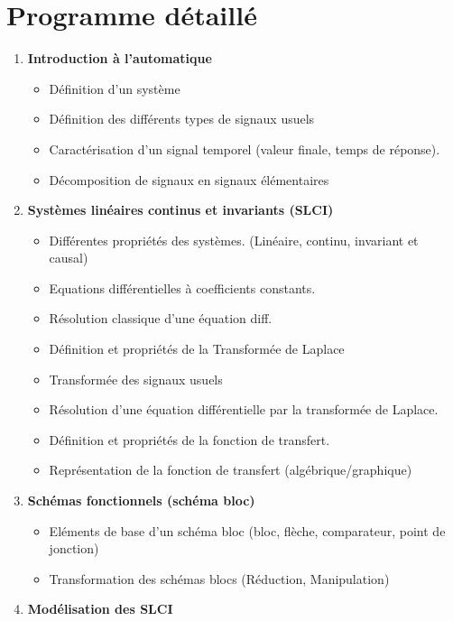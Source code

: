 \documentclass[a4paper,11pt]{article}
\begin{document}
\section*{Programme détaillé}
\begin{enumerate}
    \item \textbf{Introduction à l'automatique}
        \begin{itemize}
            \item Définition d'un système
            \item Définition des différents types de signaux usuels
            \item Caractérisation d'un signal temporel (valeur finale, temps de réponse).
            \item Décomposition de signaux en signaux élémentaires 
        \end{itemize}
    \item \textbf{Systèmes linéaires continus et invariants (SLCI)}
        \begin{itemize}
            \item Différentes propriétés des systèmes. (Linéaire, continu, invariant et causal)
            \item Equations différentielles à coefficients constants.
            \item Résolution classique d'une équation diff.
            \item Définition et propriétés de la Transformée de Laplace
            \item Transformée des signaux usuels
            \item Résolution d'une équation différentielle par la transformée de Laplace.
            \item Définition et propriétés de la fonction de transfert.
            \item Représentation de la fonction de transfert (algébrique/graphique)
        \end{itemize}
    \item \textbf{Schémas fonctionnels (schéma bloc)}
        \begin{itemize} 
            \item Eléments de base d'un schéma bloc (bloc, flèche, comparateur, point de jonction)
            \item Transformation des schémas blocs (Réduction, Manipulation)
        \end{itemize}
    \item \textbf{Modélisation des SLCI}
        \begin{itemize}

\end{itemize}
\end{enumerate}
\end{document}

